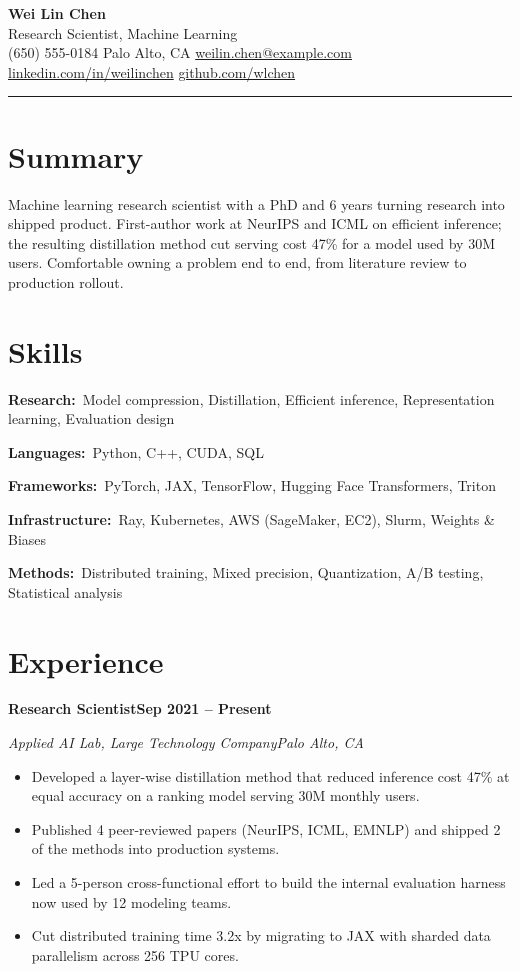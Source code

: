 \documentclass[letterpaper,10pt]{article}
\makeatletter
\newcommand{\csep}{\hspace{5pt}\textbar\hspace{5pt}}
\newcommand{\rRole}[4]{%
  \vspace{3pt}%
  \noindent\textbf{#1}\hfill\textbf{#4}\par
  \noindent\textit{\color{muted}#2}\hfill\textit{\color{muted}#3}\par
  \vspace{1pt}%
}
\newcommand{\rSkill}[2]{\noindent\textbf{#1:}\ #2\par\vspace{2pt}}
\newenvironment{rBullets}
  {\begin{itemize}[leftmargin=13pt,itemsep=1.5pt,parsep=0pt,topsep=2pt,
                   partopsep=0pt,label=\textbullet]}
  {\end{itemize}}
\def\name{Wei Lin Chen}
\def\role{Research Scientist, Machine Learning}
\def\phone{(650) 555-0184}
\def\location{Palo Alto, CA}
\def\email{weilin.chen@example.com}
\def\LinkedIn{weilinchen}
\def\github{wlchen}
\makeatother
\begin{document}
\begin{center}
  {\LARGE\bfseries\color{bodytext}\name}\\[3pt]
  {\large\color{accent}\role}\\[5pt]
  {\small
    \phone\csep
    \location\csep
    \href{mailto:\email}{\email}\csep
    \href{https://linkedin.com/in/\LinkedIn}{linkedin.com/in/\LinkedIn}\csep
    \href{https://github.com/\github}{github.com/\github}}
\end{center}
\vspace{3pt}
{\color{accent}\rule{\linewidth}{1.2pt}}

\section{Summary}
Machine learning research scientist with a PhD and 6 years turning research into
shipped product. First-author work at NeurIPS and ICML on efficient inference;
the resulting distillation method cut serving cost 47\% for a model used by 30M
users. Comfortable owning a problem end to end, from literature review to
production rollout.

\section{Skills}
\rSkill{Research}{Model compression, Distillation, Efficient inference, Representation learning, Evaluation design}
\rSkill{Languages}{Python, C++, CUDA, SQL}
\rSkill{Frameworks}{PyTorch, JAX, TensorFlow, Hugging Face Transformers, Triton}
\rSkill{Infrastructure}{Ray, Kubernetes, AWS (SageMaker, EC2), Slurm, Weights \& Biases}
\rSkill{Methods}{Distributed training, Mixed precision, Quantization, A/B testing, Statistical analysis}

\section{Experience}

\rRole{Research Scientist}{Applied AI Lab, Large Technology Company}{Palo Alto, CA}{Sep 2021 -- Present}
\begin{rBullets}
  \item Developed a layer-wise distillation method that reduced inference cost 47\% at equal accuracy on a ranking model serving 30M monthly users.
  \item Published 4 peer-reviewed papers (NeurIPS, ICML, EMNLP) and shipped 2 of the methods into production systems.
  \item Led a 5-person cross-functional effort to build the internal evaluation harness now used by 12 modeling teams.
  \item Cut distributed training time 3.2x by migrating to JAX with sharded data parallelism across 256 TPU cores.
\end{rBullets}
\end{document}
